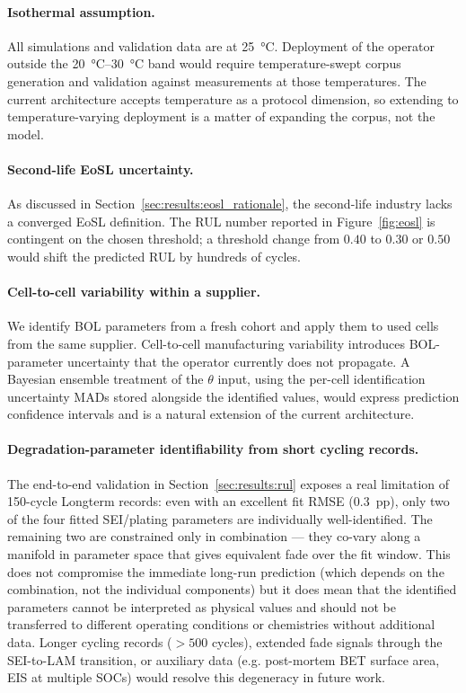 \documentclass[preprint,12pt,3p,authoryear]{elsarticle}
\begin{document}
\paragraph{Isothermal assumption.} All simulations and validation
data are at \SI{25}{\celsius}. Deployment of the operator outside the
\SIrange{20}{30}{\celsius} band would require temperature-swept
corpus generation and validation against measurements at those
temperatures. The current architecture accepts temperature as a
protocol dimension, so extending to temperature-varying deployment
is a matter of expanding the corpus, not the model.

\paragraph{Second-life EoSL uncertainty.} As discussed in
Section~\ref{sec:results:eosl_rationale}, the second-life industry
lacks a converged EoSL definition. The RUL number reported in
Figure~\ref{fig:eosl} is contingent on the chosen threshold; a
threshold change from \(0.40\) to \(0.30\) or \(0.50\) would shift the
predicted RUL by hundreds of cycles.

\paragraph{Cell-to-cell variability within a supplier.} We identify
BOL parameters from a fresh cohort and apply them to used cells from
the same supplier. Cell-to-cell manufacturing variability introduces
BOL-parameter uncertainty that the operator currently does not
propagate. A Bayesian ensemble treatment of the \(\theta\) input, using
the per-cell identification uncertainty MADs stored alongside the
identified values, would express prediction confidence intervals and is
a natural extension of the current architecture.

\paragraph{Degradation-parameter identifiability from short cycling
records.} The end-to-end validation in
Section~\ref{sec:results:rul} exposes a real limitation of
150-cycle Longterm records: even with an excellent fit RMSE
(\SI{0.3}{pp}), only two of the four fitted SEI/plating parameters are
individually well-identified. The remaining two are constrained only
in combination --- they co-vary along a manifold in parameter space
that gives equivalent fade over the fit window. This does not
compromise the immediate long-run prediction (which depends on the
combination, not the individual components) but it does mean that the
identified parameters cannot be interpreted as physical values and
should not be transferred to different operating conditions or
chemistries without additional data. Longer cycling records
(${>}\num{500}$ cycles), extended fade signals through the SEI-to-LAM
transition, or auxiliary data (e.g. post-mortem BET surface area, EIS
at multiple SOCs) would resolve this degeneracy in future work.
\end{document}
